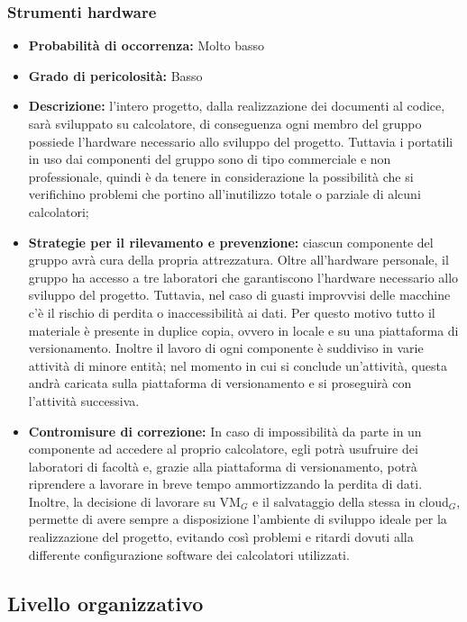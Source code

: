 \subsubsection{Strumenti hardware}
\hypertarget{subsubsect:hardware}{}
\begin{itemize}
\item \textbf{Probabilità di occorrenza:} Molto basso
\item \textbf{Grado di pericolosità:} Basso
\item \textbf{Descrizione:} l'intero progetto, dalla realizzazione dei documenti al codice, sarà sviluppato su calcolatore, di conseguenza ogni membro del gruppo possiede l'hardware necessario allo sviluppo del progetto. Tuttavia i portatili in uso dai componenti del gruppo sono di tipo commerciale e non professionale, quindi è da tenere in considerazione la possibilità che si verifichino problemi che portino all'inutilizzo totale o parziale di alcuni calcolatori;
\item \textbf{Strategie per il rilevamento e prevenzione:} ciascun componente del gruppo avrà cura della propria attrezzatura. Oltre all'hardware personale, il gruppo ha accesso a tre laboratori che garantiscono l'hardware necessario allo sviluppo del progetto. Tuttavia, nel caso di guasti improvvisi delle macchine c'è il rischio di perdita o inaccessibilità ai dati. Per questo motivo tutto il materiale è presente in duplice copia, ovvero in locale e su una piattaforma di versionamento. Inoltre il lavoro di ogni componente è suddiviso in varie attività di minore entità; nel momento in cui si conclude un'attività, questa andrà caricata sulla piattaforma di versionamento e si proseguirà con l'attività successiva. 
\item \textbf{Contromisure di correzione:} In caso di impossibilità da parte in un componente ad accedere al proprio calcolatore, egli potrà usufruire dei laboratori di facoltà e, grazie alla piattaforma di versionamento, potrà riprendere a lavorare in breve tempo ammortizzando la perdita di dati. Inoltre, la decisione di lavorare su VM$_G$ e il salvataggio della stessa in cloud$_G$, permette di avere sempre a disposizione l'ambiente di sviluppo ideale per la realizzazione del progetto, evitando così problemi e ritardi dovuti alla differente configurazione software dei calcolatori utilizzati.
\end{itemize}

\subsection{Livello organizzativo}

